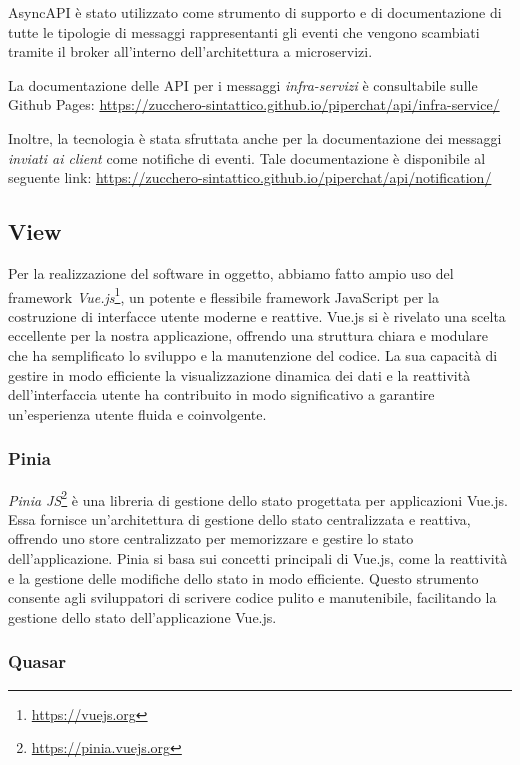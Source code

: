AsyncAPI è stato utilizzato come strumento di supporto e di documentazione di tutte le tipologie di messaggi rappresentanti gli eventi che vengono scambiati tramite il broker all'interno dell'architettura a microservizi.

La documentazione delle API per i messaggi \textit{infra-servizi} è consultabile sulle Github Pages:
\url{https://zucchero-sintattico.github.io/piperchat/api/infra-service/}

Inoltre, la tecnologia è stata sfruttata anche per la documentazione dei messaggi \textit{inviati ai client} come notifiche di eventi.
Tale documentazione è disponibile al seguente link:
\url{https://zucchero-sintattico.github.io/piperchat/api/notification/}

%
%
%
\subsection{View}

Per la realizzazione del software in oggetto, abbiamo fatto ampio uso del framework \emph{Vue.js}\footnote{\url{https://vuejs.org}}, un potente e flessibile framework JavaScript per la costruzione di interfacce utente moderne e reattive.
%
Vue.js si è rivelato una scelta eccellente per la nostra applicazione, offrendo una struttura chiara e modulare che ha semplificato lo sviluppo e la manutenzione del codice.
%
La sua capacità di gestire in modo efficiente la visualizzazione dinamica dei dati e la reattività dell'interfaccia utente ha contribuito in modo significativo a garantire un'esperienza utente fluida e coinvolgente.

%
%
%
\subsubsection{Pinia}

\emph{Pinia JS}\footnote{\url{https://pinia.vuejs.org}} è una libreria di gestione dello stato progettata per applicazioni Vue.js.
%
Essa fornisce un'architettura di gestione dello stato centralizzata e reattiva, offrendo uno store centralizzato per memorizzare e gestire lo stato dell'applicazione.
%
Pinia si basa sui concetti principali di Vue.js, come la reattività e la gestione delle modifiche dello stato in modo efficiente.
%
Questo strumento consente agli sviluppatori di scrivere codice pulito e manutenibile, facilitando la gestione dello stato dell'applicazione Vue.js.

%
%
%
\subsubsection{Quasar}

